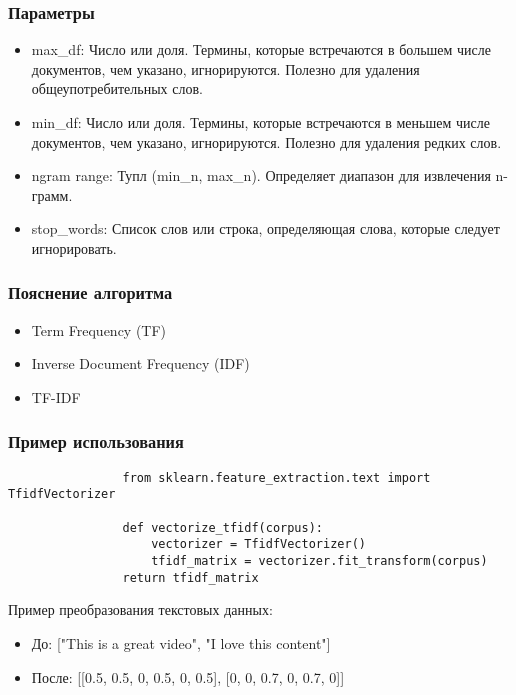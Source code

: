 		
		\subsubsection{Параметры }
			\begin{itemize}
				\item max\_df: Число или доля. Термины, которые встречаются в большем числе документов, чем указано, игнорируются. Полезно для удаления общеупотребительных слов.
				\item min\_df: Число или доля. Термины, которые встречаются в меньшем числе документов, чем указано, игнорируются. Полезно для удаления редких слов.
				\item ngram range: Тупл (min\_n, max\_n). Определяет диапазон для извлечения n-грамм.
				\item stop\_words: Список слов или строка, определяющая слова, которые следует игнорировать. 
			\end{itemize}
		
		\subsubsection{Пояснение алгоритма}
			\begin{itemize}
				\item Term Frequency (TF)
				\item Inverse Document Frequency (IDF)
				\item TF-IDF
			\end{itemize}
			
				
		\subsubsection{Пример использования}
			\begin{verbatim}
				from sklearn.feature_extraction.text import TfidfVectorizer
	
				def vectorize_tfidf(corpus):
					vectorizer = TfidfVectorizer()
					tfidf_matrix = vectorizer.fit_transform(corpus)
				return tfidf_matrix
			\end{verbatim}

			Пример преобразования текстовых данных:
			\begin{itemize}
				\item До: ["This is a great video", "I love this content"]
				\item После: [[0.5, 0.5, 0, 0.5, 0, 0.5], [0, 0, 0.7, 0, 0.7, 0]]
			\end{itemize}
			
